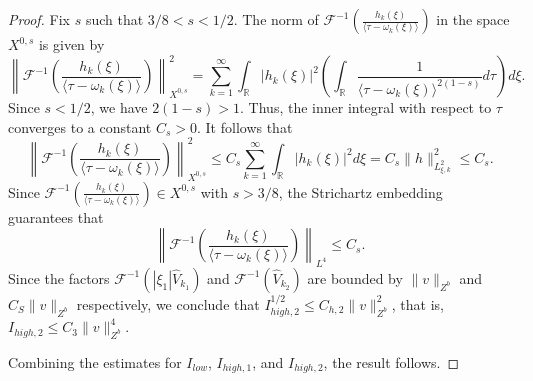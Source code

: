 \documentclass[10pt,a4paper]{amsart}
\begin{document}
\begin{proof}
Fix $s$ such that $3/8 < s < 1/2$. The norm of $\mathcal{F}^{-1}
\left( \frac{h_{k}(\xi)}{\langle \tau - \omega_{k}(\xi) \rangle}
\right)$ in the space $X^{0,s}$ is given by
\begin{equation}
\left\|\mathcal{F}^{-1} \left( \frac{h_{k}(\xi)}{\langle \tau - \omega_{k}(\xi) \rangle} \right)\right\|_{X^{0,s}}^{2} = \sum_{k=1}^{\infty} \int_{\mathbb{R}} |h_{k}(\xi)|^{2} \left( \int_{\mathbb{R}} \frac{1}{\langle \tau - \omega_{k}(\xi) \rangle^{2(1 -s)}} d\tau \right) d\xi.
\end{equation}
Since $s < 1/2$, we have $2(1 - s) > 1$. Thus, the inner integral with respect to $\tau$ converges to a constant $C_{s} > 0$. It follows that
\begin{equation}
\left\|\mathcal{F}^{-1} \left( \frac{h_{k}(\xi)}{\langle \tau - \omega_{k}(\xi) \rangle} \right)\right\|_{X^{0,s}}^{2} \le C_{s} \sum_{k=1}^{\infty} \int_{\mathbb{R}} |h_{k}(\xi)|^2 d\xi = C_{s} \|h\|_{L^{2}_{\xi, k}}^{2} \le C_{s}.
\end{equation}
Since $\mathcal{F}^{-1} \left( \frac{h_{k}(\xi)}{\langle \tau - \omega_{k}(\xi) \rangle} \right) \in X^{0,s}$ with $s > 3/8$, the Strichartz embedding guarantees that
\begin{equation}\left\|\mathcal{F}^{-1} \left( \frac{h_{k}(\xi)}{\langle \tau - \omega_{k}(\xi) \rangle} \right)\right\|_{L^{4}} \le C_{s}.\end{equation}
Since the factors $\mathcal{F}^{-1}\left(|\xi_{1}| \widehat{V}_{k_{1}}\right)$ and $\mathcal{F}^{-1}\left(\widehat{V}_{k_{2}}\right)$ are bounded by $\|v\|_{Z^{b}}$ and $C_{S}\|v\|_{Z^{b}}$ respectively, we conclude that $I_{high,2}^{1/2} \le C_{h,2}\|v\|_{Z^{b}}^{2}$, that is, $I_{high,2} \le C_{3}\|v\|_{Z^{b}}^{4}$.

Combining the estimates for $I_{low}$, $I_{high,1}$, and $I_{high,2}$, the result follows.
\end{proof}
\end{document}
